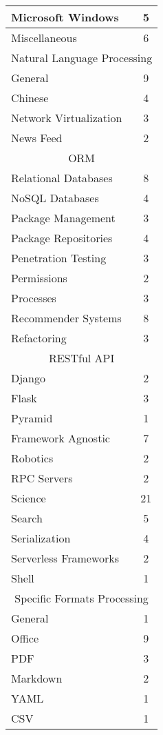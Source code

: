 \begin{longtable} {|l|c|}
    \hline
    Microsoft Windows & 5\\
    \hline
    Miscellaneous & 6\\
    \hline
    \multicolumn{2}{|c|}{Natural Language Processing}\\
    \hline
    General & 9\\
    Chinese & 4\\
    \hline
    Network Virtualization & 3\\
    \hline
    News Feed & 2\\
    \hline
    \multicolumn{2}{|c|}{ORM}\\
    \hline
    Relational Databases & 8\\
    NoSQL Databases & 4\\
    \hline
    Package Management & 3\\
    \hline
    Package Repositories & 4\\
    \hline
    Penetration Testing & 3\\
    \hline
    Permissions & 2\\
    \hline
    Processes & 3\\
    \hline
    Recommender Systems & 8\\
    \hline
    Refactoring & 3\\
    \hline
    \multicolumn{2}{|c|}{RESTful API}\\
    \hline
    Django & 2\\
    Flask & 3\\
    Pyramid & 1\\
    Framework Agnostic & 7\\
    \hline
    Robotics & 2\\
    \hline
    RPC Servers & 2\\
    \hline
    Science & 21\\
    \hline
    Search & 5\\
    \hline
    Serialization & 4\\
    \hline
    Serverless Frameworks & 2\\
    \hline
    Shell & 1\\
    \hline
    \multicolumn{2}{|c|}{Specific Formats Processing}\\
    \hline
    General & 1\\
    Office & 9\\
    PDF & 3\\
    Markdown & 2\\
    YAML & 1\\
    CSV & 1\\

\end{longtable}
